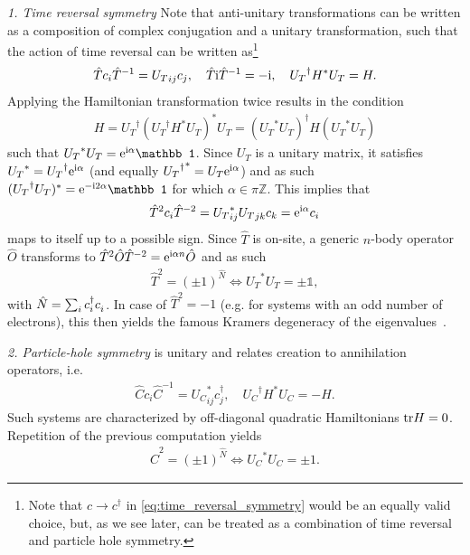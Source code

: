 {\it 1. Time reversal symmetry} Note that anti-unitary transformations can be written as a composition of complex conjugation and a unitary transformation, such that the action of time reversal can be written as\footnote{Note that $c\rightarrow c^\dag$ in \cref{eq:time_reversal_symmetry} would be an equally valid choice, but, as we see later, can be treated as a combination of time reversal and particle hole symmetry.}
\begin{align}
    \hat T c_i \hat T^{-1} = {U_T}_{ij} c_j
    ,\quad
    \hat T\mathrm i\hat T^{-1}=-\mathrm i
    ,\quad
    {U_T}^\dag H^* U_T = H.
    \label{eq:time_reversal_symmetry}
\end{align}
Applying the Hamiltonian transformation twice results in the condition
\begin{align}
    H = {U_T}^\dag ({U_T}^\dag H^* U_T)^* U_T = ({U_T}^*U_T)^\dag H ({U_T}^* U_T)
\end{align}
such that ${U_T}^* U_T = \re^{\ri\alpha}\mathbb1$.
Since $U_T$ is a unitary matrix, it satisfies ${U_T}^*={U_T}^\dag\mathrm e^{\mathrm i\alpha}$ (and equally ${{U_T}^\dag}^* = U_T\mathrm e^{\mathrm i\alpha}$) and as such $({U_T}^\dag U_T)^* = \re^{-\ri2\alpha}\mathbb1$ for which $\alpha\in\pi\mathds Z$.
This implies that
\begin{align}
    \hat T^2 c_i \hat T^{-2} = {U_T}_{ij}^*{U_T}_{jk} c_k = \mathrm e^{\mathrm i\alpha}c_i
\end{align}
maps to itself up to a possible sign.
Since $\hat T$ is on-site, a generic $n$-body operator $\hat O$ transforms to $\hat T^2\hat O \hat T^{-2} = \mathrm e^{\mathrm i\alpha n}\hat O$ and as such
\begin{align}
    \hat T^2 = (\pm 1)^{\hat N}\Leftrightarrow {U_T}^* {U_T} = \pm\mathbb1,
\end{align}
with $\hat N = \sum_i c^\dag_i c^\pdag_i$.
In case of $\hat T^2=-1$ (e.g. for systems with an odd number of electrons), this then yields the famous Kramers degeneracy of the eigenvalues~\cite{Schwabl2007}.

{\it 2. Particle-hole symmetry} is unitary and relates creation to annihilation operators, i.e.
\begin{align}
    \hat C c_i \hat C^{-1} = {U_C}^*_{ij} c^\dag_j
    ,\quad
    {U_C}^\dag H^* {U_C} = -H
    .
\end{align}
Such systems are characterized by off-diagonal quadratic Hamiltonians ${\rm tr} H=0$.
Repetition of the previous computation yields
\begin{align}
    \hat C^2 = (\pm1)^{\hat N}
    \Leftrightarrow
    {U_C}^* {U_C} = \pm 1.
\end{align}

